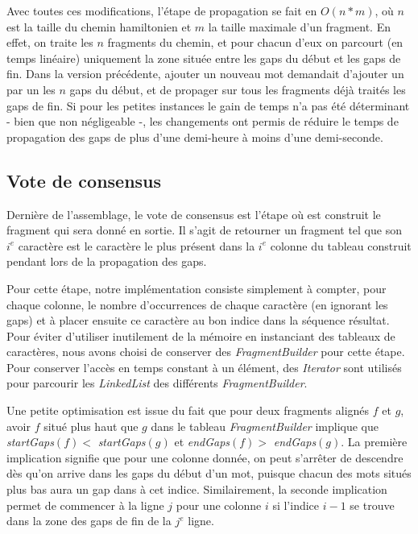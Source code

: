 \documentclass{article}
\begin{document}
Avec toutes ces modifications, l'étape de propagation se fait en $O(n*m)$, où $n$ est la taille du chemin hamiltonien et $m$ la taille maximale d'un fragment. En effet, on traite les $n$ fragments du chemin, et pour chacun d'eux on parcourt (en temps linéaire) uniquement la zone située entre les gaps du début et les gaps de fin. Dans la version précédente, ajouter un nouveau mot demandait d'ajouter un par un les $n$ gaps du début, et de propager sur tous les fragments déjà traités les gaps de fin. Si pour les petites instances le gain de temps n'a pas été déterminant - bien que non négligeable -, les changements ont permis de réduire le temps de propagation des gaps de plus d'une demi-heure à moins d'une demi-seconde.


\subsection{Vote de consensus}

Dernière de l'assemblage, le vote de consensus est l'étape où est construit le fragment qui sera donné en sortie. Il s'agit de retourner un fragment tel que son $i^e$ caractère est le caractère le plus présent dans la $i^e$ colonne du tableau construit pendant lors de la propagation des gaps.

Pour cette étape, notre implémentation consiste simplement à compter, pour chaque colonne, le nombre d’occurrences de chaque caractère (en ignorant les gaps) et à placer ensuite ce caractère au bon indice dans la séquence résultat.
Pour éviter d'utiliser inutilement de la mémoire en instanciant des tableaux de caractères, nous avons choisi de conserver des \textit{FragmentBuilder} pour cette étape. Pour conserver l'accès en temps constant à un élément, des \textit{Iterator} sont utilisés pour parcourir les \textit{LinkedList} des différents \textit{FragmentBuilder}.

Une petite optimisation est issue du fait que pour deux fragments alignés $f$ et $g$, avoir $f$ situé plus haut que $g$ dans le tableau \textit{FragmentBuilder} implique que \textit{startGaps}$(f) < $  \textit{startGaps}$(g)$ et \textit{endGaps}$(f) > $  \textit{endGaps}$(g)$. La première implication signifie que pour une colonne donnée, on peut s'arrêter de descendre dès qu'on arrive dans les gaps du début d'un mot, puisque chacun des mots situés plus bas aura un gap dans à cet indice. Similairement, la seconde implication permet de commencer à la ligne $j$ pour une colonne $i$ si l'indice $i-1$ se trouve dans la zone des gaps de fin de la $j^e$ ligne. 
\end{document}
